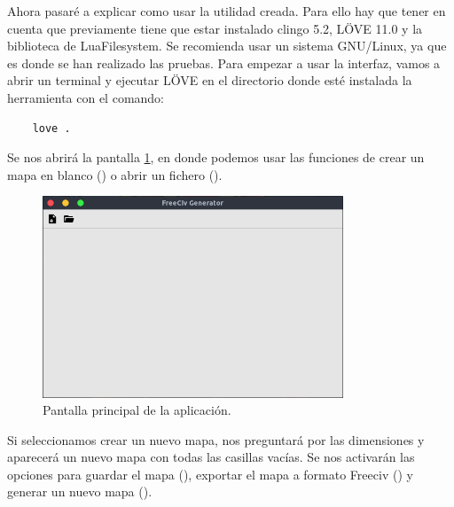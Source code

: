 Ahora pasaré a explicar como usar la utilidad creada. Para ello hay que tener en cuenta que previamente tiene que estar instalado clingo 5.2, LÖVE 11.0 y la biblioteca de LuaFilesystem. Se recomienda usar un sistema GNU/Linux, ya que es donde se han realizado las pruebas. Para empezar a usar la interfaz, vamos a abrir un terminal y ejecutar LÖVE en el directorio donde esté instalada la herramienta con el comando:

\begin{lstlisting}
	love .
\end{lstlisting}

Se nos abrirá la pantalla \ref{fig:startscreen}, en donde podemos usar las funciones de crear un mapa en blanco () o abrir un fichero ().

\begin{figure}[!h]
	\centering
	\includegraphics[width=0.8\textwidth]{images/start.png}
	\caption{Pantalla principal de la aplicación.}
	\label{fig:startscreen}
\end{figure}

Si seleccionamos crear un nuevo mapa, nos preguntará por las dimensiones y aparecerá un nuevo mapa con todas las casillas vacías. Se nos activarán las opciones para guardar el mapa (), exportar el mapa a formato Freeciv () y generar un nuevo mapa (). \\


